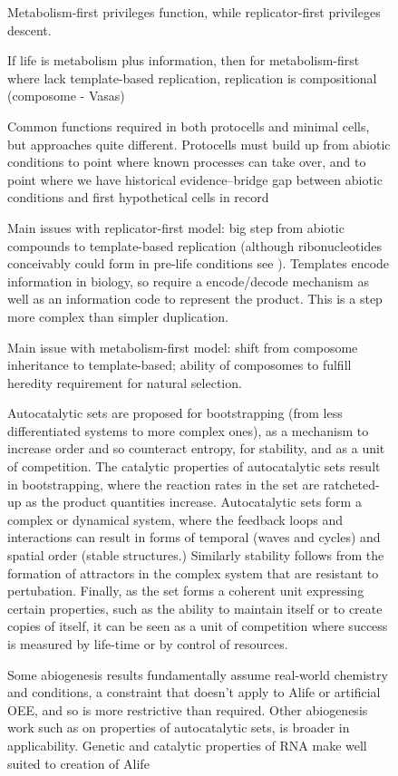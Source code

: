 \begin{figure}
\begin{framed}
Metabolism-first privileges function, while replicator-first privileges
descent.

If life is metabolism plus information, then for metabolism-first where
lack template-based replication, replication is compositional (composome
- Vasas)

Common functions required in both protocells and minimal cells, but
approaches quite different. Protocells must build up from abiotic
conditions to point where known processes can take over, and to point
where we have historical evidence--bridge gap between abiotic
conditions and first hypothetical cells in record

Main issues with replicator-first model: big step from abiotic compounds
to template-based replication (although ribonucleotides conceivably
could form in pre-life conditions see \autocite{Powner2009}). Templates
encode information in biology, so require a encode/decode mechanism as
well as an information code to represent the product. This is a step
more complex than simpler duplication.

Main issue with metabolism-first model: shift from composome inheritance
to template-based; ability of composomes to fulfill heredity requirement
for natural selection.

Autocatalytic sets are proposed for bootstrapping (from less
differentiated systems to more complex ones), as a mechanism to increase
order and so counteract entropy, for stability, and as a unit of
competition. The catalytic properties of autocatalytic sets result in
bootstrapping, where the reaction rates in the set are ratcheted-up as
the product quantities increase. Autocatalytic sets form a complex or
dynamical system, where the feedback loops and interactions can result
in forms of temporal (waves and cycles) and spatial order (stable
structures.) Similarly stability follows from the formation of
attractors in the complex system that are resistant to pertubation.
Finally, as the set forms a coherent unit expressing certain properties,
such as the ability to maintain itself or to create copies of itself, it
can be seen as a unit of competition where success is measured by
life-time or by control of resources.

Some abiogenesis results fundamentally assume real-world chemistry and
conditions, a constraint that doesn't apply to Alife or artificial OEE,
and so is more restrictive than required. Other abiogenesis work such as
on properties of autocatalytic sets, is broader in applicability.
Genetic and catalytic properties of RNA make well suited to creation of
Alife \autocite{Cheng2010}


\end{framed}
\end{figure}

